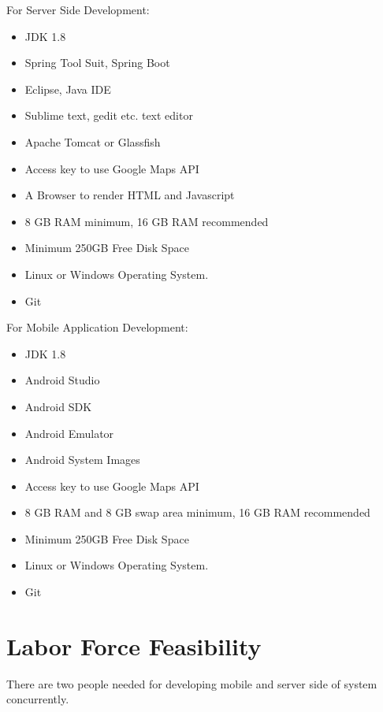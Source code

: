 For Server Side Development:
\begin{itemize}
    \item JDK 1.8
    \item Spring Tool Suit, Spring Boot
    \item Eclipse, Java IDE
    \item Sublime text, gedit etc. text editor
    \item Apache Tomcat or Glassfish
    \item Access key to use Google Maps API
    \item A Browser to render HTML and Javascript
    \item 8 GB RAM minimum, 16 GB RAM recommended
    \item Minimum 250GB Free Disk Space    
    \item Linux or Windows Operating System.
    \item Git
    
\end{itemize}

For Mobile Application Development:
\begin{itemize}
    \item JDK 1.8
    \item Android Studio
    \item Android SDK
    \item Android Emulator
    \item Android System Images
    \item Access key to use Google Maps API
    \item 8 GB RAM and 8 GB swap area minimum, 16 GB RAM recommended
    \item Minimum 250GB Free Disk Space
    \item Linux or Windows Operating System.
    \item Git    
\end{itemize}


\section{Labor Force Feasibility}
There are two people needed for developing mobile and server side of system concurrently.



